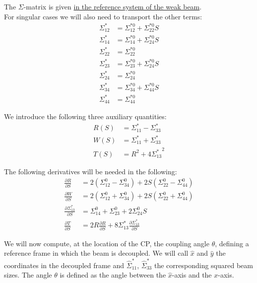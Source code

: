 The $\Sigma$-matrix is given \underline{in the reference system of the weak beam}.%
~\\
For singular cases we will also need to transport the other terms:
\begin{align}
\Sigma^*_{12} &= \Sigma_{12} ^{*0}+\Sigma_{22} ^{*0}S\\
\Sigma^*_{14} &= \Sigma_{14} ^{*0}+\Sigma_{24} ^{*0}S\\
\Sigma^*_{22} &= \Sigma_{22} ^{*0}\\
\Sigma^*_{23} &= \Sigma_{23} ^{*0}+\Sigma_{24} ^{*0}S\\
\Sigma^*_{24} &= \Sigma_{24} ^{*0}\\
\Sigma^*_{34} &= \Sigma_{34} ^{*0}+\Sigma_{44} ^{*0}S\\
\Sigma^*_{44} &= \Sigma_{44} ^{*0}
\end{align}



We introduce the following three auxiliary quantities:
\begin{align}
R\left(S \right)  &= \Sigma^*_{11} - \Sigma^*_{33}\\
W\left(S\right) &= \Sigma^*_{11} + \Sigma^*_{33}\\
T\left( S \right) &= {R^2 + 4 {\Sigma^*_{13}}^2 } \label{eq:Tfun}
\end{align}

The following derivatives will be needed in the following:
\begin{align}
\frac{\partial R}{\partial S}  &= 2\left(\Sigma_{12} ^0 - \Sigma_{34}^0\right) + 2S\left(\Sigma_{22} ^0 - \Sigma_{44}^0\right) \\ 
\frac{\partial W}{\partial S} &= 2\left(\Sigma_{12} ^0 + \Sigma_{34}^0\right) + 2S\left(\Sigma_{22} ^0 + \Sigma_{44}^0\right) \\
\frac{\partial \Sigma^*_{13}}{\partial S}  &= \Sigma_{14} ^0 + \Sigma_{23} ^0 + 2\Sigma_{24} ^0 S\\
\frac{\partial T}{\partial S}  &= 2R \frac{\partial R}{\partial  S} +8  \Sigma^*_{13} \frac{\partial \Sigma^*_{13}}{\partial  S}
\end{align}

We will now compute, at the location of the CP, the coupling angle $\theta$, defining a reference frame in which the beam is decoupled.
We will call $\hat{x}$ and $\hat{y}$ the coordinates in the decoupled frame and  $\hat{\Sigma}^*_{11}$,  $\hat{\Sigma}^*_{33}$ the corresponding squared beam sizes. The angle $\theta$ is defined as the angle between the $\hat{x}$-axis and the $x$-axis.

